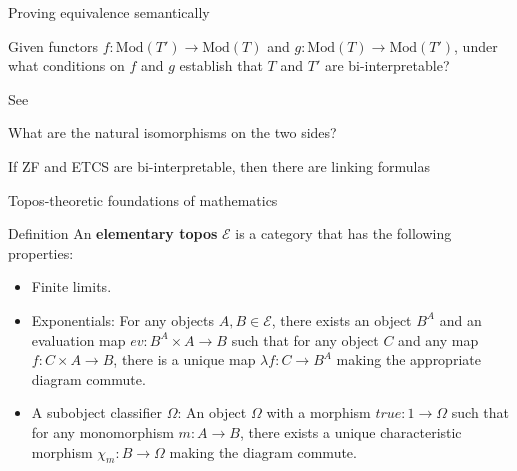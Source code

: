 \documentclass[ignorenonframetext,fleqn]{beamer}
\newcommand{\2}{\mathcal}
\begin{document}
\begin{frame}{Proving equivalence semantically}

  Given functors $f:\mathrm{Mod}(T')\to\mathrm{Mod}(T)$ and
  $g:\mathrm{Mod}(T)\to\mathrm{Mod}(T')$, under what conditions on $f$
  and $g$ establish that $T$ and $T'$ are bi-interpretable?

  \vfill See \citep{gajda}



\end{frame}

\begin{frame}

  What are the natural isomorphisms on the two sides? 

  If ZF and ETCS are bi-interpretable, then there are linking formulas 
  



\end{frame}

\begin{frame}{Topos-theoretic foundations of mathematics}

  \begin{block}{Definition}
    An \textbf{elementary topos} $\2E$ is a category that has the
    following properties:
        \begin{itemize}
        \item Finite limits.
        \item Exponentials: For any objects $A, B \in \mathcal{E}$,
          there exists an object $B^A$ and an evaluation map
          $ev: B^A \times A \to B$ such that for any object $C$ and
          any map $f: C \times A \to B$, there is a unique map
          $\lambda f: C \to B^A$ making the appropriate diagram
          commute.
        \item A subobject classifier $\Omega$: An object $\Omega$ with
          a morphism $true: 1 \to \Omega$ such that for any
          monomorphism $m: A \to B$, there exists a unique
          characteristic morphism $\chi_m: B \to \Omega$ making the
          diagram commute.
       \end{itemize}
     \end{block}

\end{frame}
\end{document}
